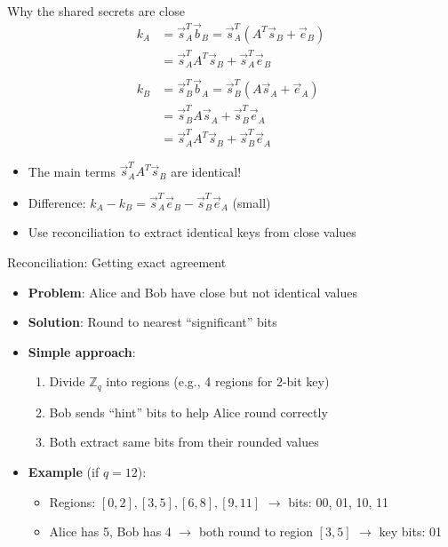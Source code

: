 \documentclass[aspectratio=169, lualatex, handout]{beamer}
\begin{document}
\begin{frame}{Why the shared secrets are close}
	\begin{align*}
		k_A & = \vec{s}_A^T \vec{b}_B = \vec{s}_A^T (A^T\vec{s}_B + \vec{e}_B) \\
		    & = \vec{s}_A^T A^T \vec{s}_B + \vec{s}_A^T \vec{e}_B              \\
		\\
		k_B & = \vec{s}_B^T \vec{b}_A = \vec{s}_B^T (A\vec{s}_A + \vec{e}_A)   \\
		    & = \vec{s}_B^T A \vec{s}_A + \vec{s}_B^T \vec{e}_A                \\
		    & = \vec{s}_A^T A^T \vec{s}_B + \vec{s}_B^T \vec{e}_A
	\end{align*}

	\begin{itemize}
		\item The main terms $\vec{s}_A^T A^T \vec{s}_B$ are identical!
		\item Difference: $k_A - k_B = \vec{s}_A^T \vec{e}_B - \vec{s}_B^T \vec{e}_A$ (small)
		\item Use reconciliation to extract identical keys from close values
	\end{itemize}
\end{frame}

\begin{frame}{Reconciliation: Getting exact agreement}
	\begin{itemize}
		\item \textbf{Problem}: Alice and Bob have close but not identical values
		\item \textbf{Solution}: Round to nearest ``significant'' bits
		\item \textbf{Simple approach}:
		      \begin{enumerate}
			      \item Divide $\mathbb{Z}_q$ into regions (e.g., 4 regions for 2-bit key)
			      \item Bob sends ``hint'' bits to help Alice round correctly
			      \item Both extract same bits from their rounded values
		      \end{enumerate}
		\item \textbf{Example} (if $q = 12$):
		      \begin{itemize}
			      \item Regions: $[0,2], [3,5], [6,8], [9,11]$ $\rightarrow$ bits: 00, 01, 10, 11
			      \item Alice has 5, Bob has 4 $\rightarrow$ both round to region $[3,5]$ $\rightarrow$ key bits: 01
		      \end{itemize}
	\end{itemize}
\end{frame}
\end{document}
